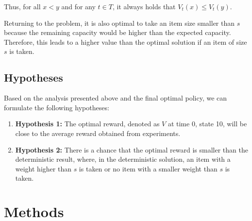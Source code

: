 Thus, for all $x < y$ and for any $t \in T$, it always holds that $V_t(x) \leq V_t(y)$.

Returning to the problem, it is also optimal to take an item size smaller than $s$ because the remaining capacity would be higher than the expected capacity. Therefore, this leads to a higher value than the optimal solution if an item of size $s$ is taken.

\subsection{Hypotheses}

Based on the analysis presented above and the final optimal policy, we can formulate the following hypotheses:

\begin{enumerate}[label=(\roman*)]
    \item \textbf{Hypothesis 1:} The optimal reward, denoted as $V$ at time 0, state 10, will be close to the average reward obtained from experiments.
    \item \textbf{Hypothesis 2:} There is a chance that the optimal reward is smaller than the deterministic result, where, in the deterministic solution, an item with a weight higher than $s$ is taken or no item with a smaller weight than $s$ is taken.
\end{enumerate}

\section{Methods}

